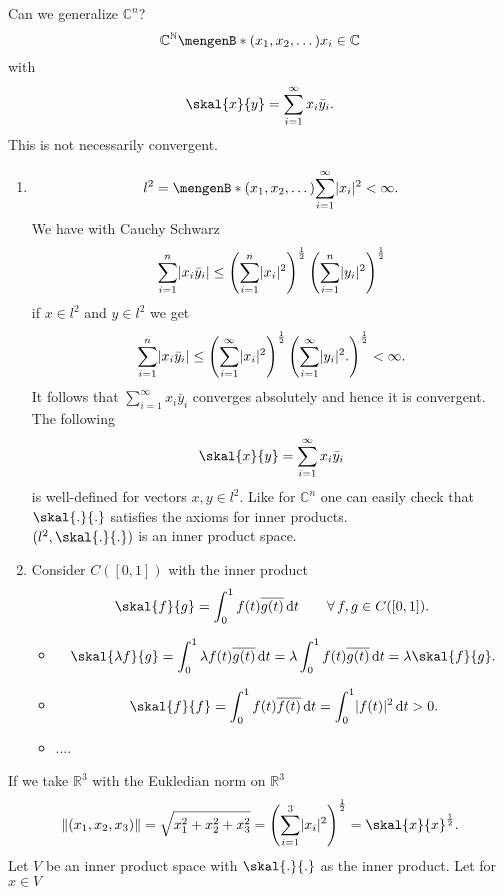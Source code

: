 Can we generalize $\mathbb{C}^n$? \\
\[
	\mathbb{C}^{\mathbb{N}} \set[(x_1,x_2, \dots)]{x_i \in \mathbb{C}}
\]
with
\[
	\skal{x}{y} = \sum^{\infty}_{i=1} x_i \bar{y}_i.
\]
This is not necessarily convergent.
\begin{beispiele}
	\begin{enumerate}[(1)]
		\item 	\[
		l^2 = \set[(x_1,x_2, \dots)]{ \sum^{\infty}_{i=1} \abs{x_i}^2 < \infty}.
	\]
	We have with Cauchy Schwarz
	\[
		\sum^{n}_{i=1} \lvert x_i \bar{y}_i\rvert \leq \left( \sum^{n}_{i=1} \lvert x_i\rvert^2 \right)^{\frac{1}{2}} \left( \sum^{n}_{i=1} \lvert y_i\rvert^2 \right)^{\frac{1}{2}}
	\]
	if $x \in l^2$ and $y \in l^2$ we get
	\begin{align*}
		\sum^{n}_{i=1}\lvert x_i \bar{y}_i\rvert \leq \left( \sum^{\infty}_{i=1} \lvert x_i\rvert^2 \right)^{\frac{1}{2}} \left( \sum_{i=1}^{\infty} \lvert y_i\rvert^2. \right)^{\frac{1}{2}} < \infty.
	\end{align*}
	It follows that $\sum_{i=1}^{\infty} x_i \bar{y}_i$ converges absolutely and hence it is convergent. The following 
	\[
		\skal{x}{y} = \sum^{\infty}_{i=1} x_i \bar{y}_i
	\]
	is well-defined for vectors $x,y \in l^2$. Like for $\mathbb{C}^n$ one can easily check that $\skal{.}{.}$ satisfies the axioms for inner products. \\
	$(l^2, \skal{.}{.})$ is an inner product space.
	\item Consider $C([0,1])$ with the inner product
	\[
		\skal{f}{g} = \int_{0}^{1}f(t) \overline{g(t)} \,\mathrm{d}t \qquad \forall\, f,g \in C([0,1]).
	\]
	\begin{itemize}
		\item 	\[
			\skal{\lambda f}{g} = \int_{0}^{1}\lambda f(t) \overline{g(t)} \,\mathrm{d}t = \lambda \int_{0}^{1}f(t) \overline{g(t)} \,\mathrm{d}t = \lambda \skal{f}{g}.
		\]
		\item \[
			\skal{f}{f} = \int_{0}^{1}f(t) \overline{f(t)} \,\mathrm{d}t = \int_{0}^{1} \abs{f(t)}^2 \,\mathrm{d}t >0.
		\]	
		\item $\dots$.
	\end{itemize}
	\end{enumerate}
\end{beispiele}
If we take $\mathbb{R}^3$ with the Eukledian norm on $\mathbb{R}^3$
\[
	\norm{(x_1,x_2,x_3)} = \sqrt{x_1^2 + x_2^2 + x_3^2} = \left( \sum_{i=1}^{3} \abs{x_i}^2 \right)^{\frac{1}{2}} = \skal{x}{x}^{\frac{1}{2}}.
\]
Let $V$ be an inner product space with $\skal{.}{.}$ as the inner product. Let for $x \in V$
